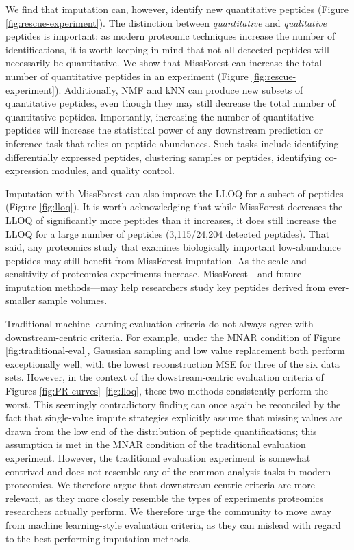 \documentclass{article}
\begin{document}
We find that imputation can, however, identify new quantitative peptides (Figure \ref{fig:rescue-experiment}). The distinction between \textit{quantitative} and \textit{qualitative} peptides is important: as modern proteomic techniques increase the number of identifications, it is worth keeping in mind that not all detected peptides will necessarily be quantitative. We show that MissForest can increase the total number of quantitative peptides in an experiment (Figure \ref{fig:rescue-experiment}). Additionally, NMF and kNN can produce new subsets of quantitative peptides, even though they may still decrease the total number of quantitative peptides. Importantly, increasing the number of quantitative peptides will increase the statistical power of any downstream prediction or inference task that relies on peptide abundances. Such tasks include identifying differentially expressed peptides, clustering samples or peptides, identifying co-expression modules, and quality control. 

Imputation with MissForest can also improve the LLOQ for a subset of peptides (Figure \ref{fig:lloq}). It is worth acknowledging that while MissForest decreases the LLOQ of significantly more peptides than it increases, it does still increase the LLOQ for a large number of peptides (3,115/24,204 detected peptides). That said, any proteomics study that examines biologically important low-abundance peptides may still benefit from MissForest imputation. As the scale and sensitivity of proteomics experiments increase, MissForest---and future imputation methods---may help researchers study key peptides derived from ever-smaller sample volumes. 

Traditional machine learning evaluation criteria do not always agree with downstream-centric criteria. For example, under the MNAR condition of Figure \ref{fig:traditional-eval}, Gaussian sampling and low value replacement both perform exceptionally well, with the lowest reconstruction MSE for three of the six data sets. However, in the context of the dowstream-centric evaluation criteria of Figures \ref{fig:PR-curves}--\ref{fig:lloq}, these two methods consistently perform the worst. This seemingly contradictory finding can once again be reconciled by the fact that single-value impute strategies  explicitly assume that missing values are drawn from the low end of the distribution of peptide quantifications; this assumption is met in the MNAR condition of the traditional evaluation experiment. However, the traditional evaluation experiment is somewhat contrived and does not resemble any of the common analysis tasks in modern proteomics. We therefore argue that downstream-centric criteria are more relevant, as they more closely resemble the types of experiments proteomics researchers actually perform. We therefore urge the community to move away from machine learning-style evaluation criteria, as they can mislead with regard to the best performing imputation methods.
\end{document}
